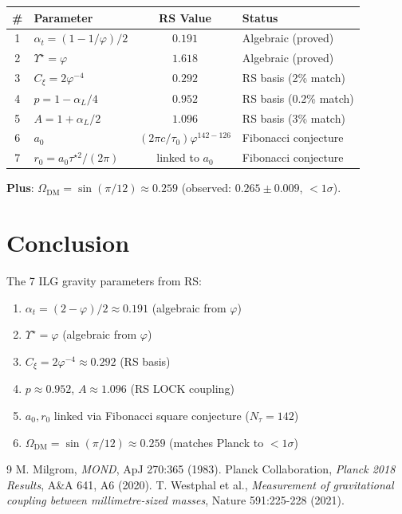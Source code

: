 \documentclass[12pt,a4paper]{article}
\theoremstyle{definition}
\theoremstyle{remark}
\begin{document}
\begin{center}
\begin{tabular}{clcl}
\hline
\textbf{\#} & \textbf{Parameter} & \textbf{RS Value} & \textbf{Status} \\
\hline
1 & $\alpha_t = (1-1/\varphi)/2$ & $0.191$ & Algebraic (proved) \\
2 & $\Upsilon^\star = \varphi$ & $1.618$ & Algebraic (proved) \\
3 & $C_\xi = 2\varphi^{-4}$ & $0.292$ & RS basis (2\% match) \\
4 & $p = 1 - \alpha_L/4$ & $0.952$ & RS basis (0.2\% match) \\
5 & $A = 1 + \alpha_L/2$ & $1.096$ & RS basis (3\% match) \\
6 & $a_0$ & $(2\pi c/\tau_0)\varphi^{142-126}$ & Fibonacci conjecture \\
7 & $r_0 = a_0 \tau^{\star 2}/(2\pi)$ & linked to $a_0$ & Fibonacci conjecture \\
\hline
\end{tabular}
\end{center}

\textbf{Plus}: $\Omega_\mathrm{DM} = \sin(\pi/12) \approx 0.259$ (observed: $0.265 \pm 0.009$, $< 1\sigma$).

\section{Conclusion}

The 7 ILG gravity parameters from RS:
\begin{enumerate}
\item $\alpha_t = (2-\varphi)/2 \approx 0.191$ (algebraic from $\varphi$)
\item $\Upsilon^\star = \varphi$ (algebraic from $\varphi$)
\item $C_\xi = 2\varphi^{-4} \approx 0.292$ (RS basis)
\item $p \approx 0.952$, $A \approx 1.096$ (RS LOCK coupling)
\item $a_0, r_0$ linked via Fibonacci square conjecture ($N_\tau = 142$)
\item $\Omega_\mathrm{DM} = \sin(\pi/12) \approx 0.259$ (matches Planck to $< 1\sigma$)
\end{enumerate}

\begin{thebibliography}{9}
 M. Milgrom, \emph{MOND}, ApJ 270:365 (1983).
 Planck Collaboration, \emph{Planck 2018 Results}, A\&A 641, A6 (2020).
 T. Westphal et al., \emph{Measurement of gravitational coupling between millimetre-sized masses}, Nature 591:225-228 (2021).
\end{thebibliography}
\end{document}
